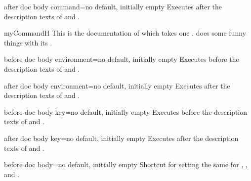 \begin{docTcbKey}[][doc new=2015-10-09]{after doc body command}{=}{no default, initially empty}
  Executes  after the description texts
  of  and .
\begin{dispExample}

\begin{docCommand*}{myCommandH}{}
  This is the documentation of  which takes one .
   does some funny things with its .
\end{docCommand*}
\end{dispExample}
\end{docTcbKey}


\begin{docTcbKey}[][doc new=2015-10-09]{before doc body environment}{=}{no default, initially empty}
  Executes  before the description texts
  of  and .
\end{docTcbKey}

\begin{docTcbKey}[][doc new=2015-10-09]{after doc body environment}{=}{no default, initially empty}
  Executes  after the description texts
  of  and .
\end{docTcbKey}


\begin{docTcbKey}[][doc new=2015-10-09]{before doc body key}{=}{no default, initially empty}
  Executes  before the description texts
  of  and .
\end{docTcbKey}

\begin{docTcbKey}[][doc new=2015-10-09]{after doc body key}{=}{no default, initially empty}
  Executes  after the description texts
  of  and .
\end{docTcbKey}

\begin{docTcbKey}[][doc new=2015-10-09]{before doc body}{=}{no default, initially empty}
  Shortcut for setting the same  for
  , ,
  and .
\end{docTcbKey}

